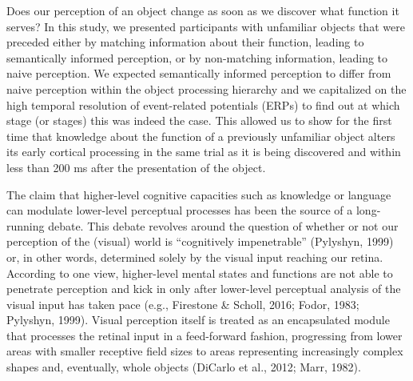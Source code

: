 \documentclass[
  english,
  doc,12pt,twoside,floatsintext]{apa7}
\begin{document}
Does our perception of an object change as soon as we discover what function it serves? In this study, we presented participants with unfamiliar objects that were preceded either by matching information about their function, leading to semantically informed perception, or by non-matching information, leading to naive perception. We expected semantically informed perception to differ from naive perception within the object processing hierarchy and we capitalized on the high temporal resolution of event-related potentials (ERPs) to find out at which stage (or stages) this was indeed the case. This allowed us to show for the first time that knowledge about the function of a previously unfamiliar object alters its early cortical processing in the same trial as it is being discovered and within less than 200 ms after the presentation of the object.

The claim that higher-level cognitive capacities such as knowledge or language can modulate lower-level perceptual processes has been the source of a long-running debate. This debate revolves around the question of whether or not our perception of the (visual) world is ``cognitively impenetrable'' (Pylyshyn, 1999) or, in other words, determined solely by the visual input reaching our retina. According to one view, higher-level mental states and functions are not able to penetrate perception and kick in only after lower-level perceptual analysis of the visual input has taken pace (e.g., Firestone \& Scholl, 2016; Fodor, 1983; Pylyshyn, 1999). Visual perception itself is treated as an encapsulated module that processes the retinal input in a feed-forward fashion, progressing from lower areas with smaller receptive field sizes to areas representing increasingly complex shapes and, eventually, whole objects (DiCarlo et al., 2012; Marr, 1982).
\end{document}
